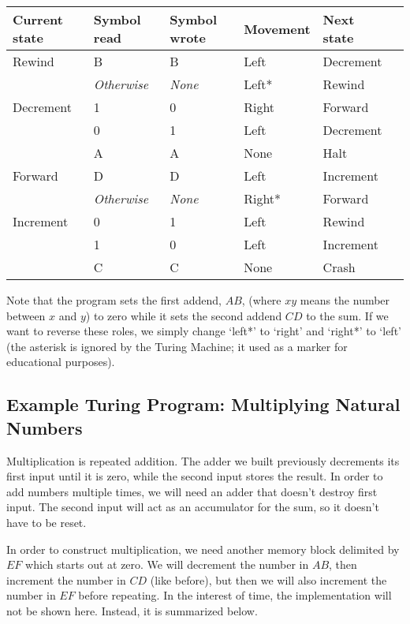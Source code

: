 \documentclass[11pt, letterpaper, twoside, openright]{book}
\begin{document}
\begin{tabular}{|l|l|l|l|l|l|}
\hline
Current state & Symbol read & Symbol wrote & Movement & Next state \\
\hline
Rewind & B & B & Left & Decrement \\
 & \textit{Otherwise} & \textit{None} & Left* & Rewind \\
\hline
Decrement & 1 & 0 & Right & Forward \\
 & 0 & 1 & Left & Decrement \\
 & A & A & None & Halt \\
\hline
Forward & D & D & Left & Increment \\
 & \textit{Otherwise} & \textit{None} & Right* & Forward \\
\hline
Increment & 0 & 1 & Left & Rewind \\
 & 1 & 0 & Left & Increment \\
 & C & C & None & Crash \\
\hline
\end{tabular}

Note that the program sets the first addend, $AB$, (where $xy$ means the number between $x$ and $y$) to zero while it sets the second addend $CD$ to the sum. If we want to reverse these roles, we simply change `left*' to `right' and `right*' to `left' (the asterisk is ignored by the Turing Machine; it used as a marker for educational purposes).

\subsection{Example Turing Program: Multiplying Natural Numbers}
Multiplication is repeated addition. The adder we built previously decrements its first input until it is zero, while the second input stores the result. In order to add numbers multiple times, we will need an adder that doesn't destroy first input. The second input will act as an accumulator for the sum, so it doesn't have to be reset.

In order to construct multiplication, we need another memory block delimited by $EF$ which starts out at zero. We will decrement the number in $AB$, then increment the number in $CD$ (like before), but then we will also increment the number in $EF$ before repeating. In the interest of time, the implementation will not be shown here. Instead, it is summarized below.
\end{document}
